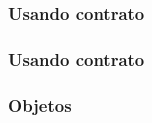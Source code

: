 \documentclass[14pt]{beamer}
\begin{document}
\newsavebox{\listingboxj}
\begin{lrbox}{\listingboxj}

\end{lrbox}

\frame
{
  \frametitle{Usando contrato}

  \usebox{\listingboxj}
}

\newsavebox{\listingboxk}
\begin{lrbox}{\listingboxk}

\end{lrbox}

\newsavebox{\listingboxl}
\begin{lrbox}{\listingboxl}

\end{lrbox}

\frame
{
  \frametitle{Usando contrato}

  \usebox{\listingboxk}
  \usebox{\listingboxl}
}

\frame
{
  \frametitle{Objetos}

  
}
\end{document}
